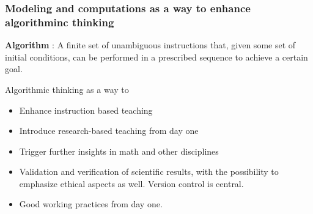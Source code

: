 \documentclass{beamer}
\begin{document}
\begin{frame}
\frametitle{Modeling and computations as a way to enhance algorithminc thinking}

\begin{block}{}
\textbf{Algorithm} : A finite set of unambiguous instructions that, given some set of initial conditions, can be performed in a prescribed sequence to achieve a certain goal.
\end{block}

\begin{block}{Algorithmic  thinking as a way to }

\begin{itemize}
\item Enhance instruction based teaching

\item Introduce research-based teaching  from day one

\item Trigger further insights in math and other disciplines 

\item Validation and verification of scientific results, with the possibility to emphasize ethical aspects as well. Version control is central.

\item Good working practices from day one.
\end{itemize}

\noindent
\end{block}
\end{frame}
\end{document}
